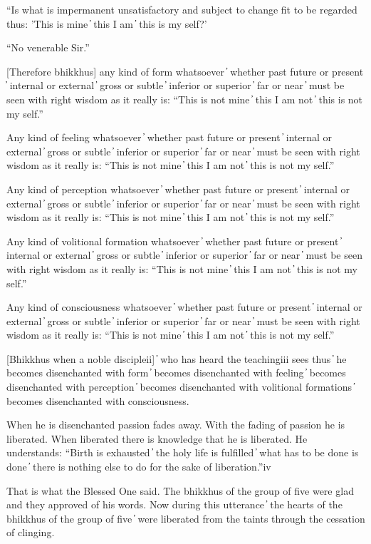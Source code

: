 “Is what is impermanent unsatisfactory and subject to change fit to be regarded thus: 'This is mine  ̓  this I am  ̓  this is my self?'

“No venerable Sir.”

[Therefore bhikkhus] any kind of form whatsoever  ̓  whether past future or present  ̓  internal or external  ̓  gross or subtle  ̓  inferior or superior  ̓  far or near  ̓  must be seen with right wisdom as it really is: “This is not mine  ̓  this I am not  ̓  this is not my self.”

Any kind of feeling whatsoever  ̓  whether past future or present  ̓  internal or external  ̓  gross or subtle  ̓  inferior or superior  ̓  far or near  ̓  must be seen with right wisdom as it really is: “This is not mine  ̓  this I am not  ̓  this is not my self.”

Any kind of perception whatsoever  ̓  whether past future or present  ̓  internal or external  ̓  gross or subtle  ̓  inferior or superior  ̓  far or near  ̓  must be seen with right wisdom as it really is: “This is not mine  ̓  this I am not  ̓  this is not my self.”

Any kind of volitional formation whatsoever  ̓  whether past future or present  ̓  internal or external  ̓  gross or subtle  ̓  inferior or superior  ̓  far or near  ̓  must be seen with right wisdom as it really is: “This is not mine  ̓  this I am not  ̓  this is not my self.”

Any kind of consciousness whatsoever  ̓  whether past future or present  ̓  internal or external  ̓  gross or subtle  ̓  inferior or superior  ̓  far or near  ̓  must be seen with right wisdom as it really is: “This is not mine  ̓  this I am not  ̓  this is not my self.”

[Bhikkhus when a noble discipleii]  ̓  who has heard the teachingiii sees thus  ̓  he becomes disenchanted with form  ̓  becomes disenchanted with feeling  ̓  becomes disenchanted with perception  ̓  becomes disenchanted with volitional formations  ̓  becomes disenchanted with consciousness.

When he is disenchanted passion fades away. With the fading of passion he is liberated. When liberated there is knowledge that he is liberated. He understands: “Birth is exhausted  ̓  the holy life is fulfilled  ̓  what has to be done is done  ̓  there is nothing else to do for the sake of liberation.”iv

That is what the Blessed One said. The bhikkhus of the group of five were glad and they approved of his words. Now during this utterance  ̓  the hearts of the bhikkhus of the group of five  ̓  were liberated from the taints through the cessation of clinging.

